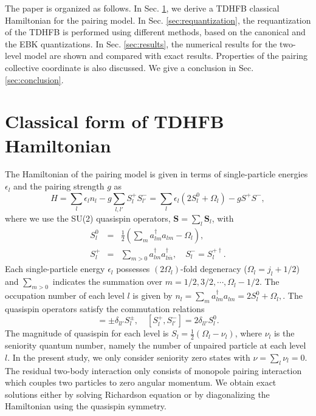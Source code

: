 \documentclass[%
superscriptaddress,
preprint,
showpacs,
nofootinbib,
amsmath,amssymb,
prc,
floatfix ]%
{revtex4-1}
\begin{document}
The paper is organized as follows. 
In Sec. \ref{sec:TDHFB},
we derive a TDHFB classical Hamiltonian for the pairing model.
In Sec. \ref{sec:requantization}, 
the requantization of the TDHFB is performed using different methods,
based on the canonical and the EBK quantizations.
In Sec. \ref{sec:results}, 
the numerical results for the two-level model are shown and compared with
exact results.
Properties of the pairing collective coordinate is also discussed.
We give a conclusion in Sec. \ref{sec:conclusion}.


\section{Classical form of TDHFB Hamiltonian}
\label{sec:TDHFB}

The Hamiltonian of the pairing model is given in terms of
single-particle energies $\epsilon_l$ and the pairing strength $g$ as
\begin{equation}
	H = \sum_l \epsilon_l n_l - g \sum_{l,l'} S_l^+ S_{l'}^-
    = \sum_l\epsilon_l(2S_l^0+\Omega_l) - g S^+ S^{-} ,
\end{equation}
where we use the SU(2) quasispin operators,
$\boldsymbol{S}=\sum_l \boldsymbol{S}_l$, with
\begin{eqnarray}
        S_l^0 &=& \frac{1}{2}(\sum_ma_{lm}^{\dag}a_{lm}-\Omega_l) ,\\
        S_l^{+} &=& \sum_{m>0}a_{lm}^{\dag}a_{l\overline{m}}^{\dag} ,
\quad   S_l^{-} = S_l^{+\dag} .
\end{eqnarray}
Each single-particle energy $\epsilon_l$ possesses $(2\Omega_l)$-fold
degeneracy ($\Omega_l=j_l+1/2$)
and $\sum_{m>0}$ indicates the summation over $m=1/2,3/2,\cdots,\Omega_l-1/2$.
The occupation number of each level $l$ is given by
$
	n_l = \sum_m a^{\dag}_{lm}a_{lm} = 2S_l^0+\Omega_l ,
$.
The quasispin operators satisfy the commutation relations
\begin{equation}
  [S_l^0,S_{l'}^{\pm}] = \pm\delta_{ll'}S_{l}^{\pm},
	\quad [S_{l}^{+},S_{l'}^{-}] = 2\delta_{ll'}S_{l}^{0} .
\end{equation}
The magnitude of quasispin for each level is
$S_l=\frac{1}{2}(\Omega_l-\nu_l)$, where $\nu_l$ is the seniority
quantum number, namely the number of unpaired particle at each level $l$.
In the present study, we only consider seniority zero states with
$\nu=\sum_l \nu_l=0$.
The residual two-body interaction only consists of monopole pairing
interaction which couples two particles to zero angular momentum.
We obtain exact solutions either by solving Richardson equation
\cite{Richardson,Richardson2,Richardson3} or
by diagonalizing the Hamiltonian using the quasispin symmetry.
\end{document}
